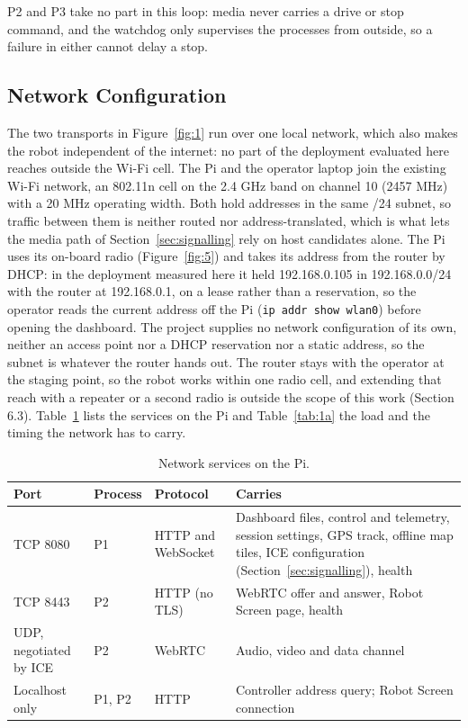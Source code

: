 P2 and P3 take no part in this loop: media never carries a drive or stop command, and the watchdog only supervises the processes from outside, so a failure in either cannot delay a stop.

\subsection{Network Configuration}
\label{sec:network_configuration}

The two transports in Figure~\ref{fig:1} run over one local network, which also makes the robot independent of the internet: no part of the deployment evaluated here reaches outside the Wi-Fi cell. The Pi and the operator laptop join the existing Wi-Fi network, an 802.11n cell on the 2.4 GHz band on channel 10 (2457 MHz) with a 20 MHz operating width. Both hold addresses in the same /24 subnet, so traffic between them is neither routed nor address-translated, which is what lets the media path of Section~\ref{sec:signalling} rely on host candidates alone. The Pi uses its on-board radio (Figure~\ref{fig:5}) and takes its address from the router by DHCP: in the deployment measured here it held 192.168.0.105 in 192.168.0.0/24 with the router at 192.168.0.1, on a lease rather than a reservation, so the operator reads the current address off the Pi (\texttt{ip addr show wlan0}) before opening the dashboard. The project supplies no network configuration of its own, neither an access point nor a DHCP reservation nor a static address, so the subnet is whatever the router hands out. The router stays with the operator at the staging point, so the robot works within one radio cell, and extending that reach with a repeater or a second radio is outside the scope of this work (Section 6.3). Table~\ref{tab:1} lists the services on the Pi and Table~\ref{tab:1a} the load and the timing the network has to carry.

\begin{table}[!t]
\centering
\caption{Network services on the Pi.}
\label{tab:1}
\begin{tabularx}{\linewidth}{l l l X}
\toprule
Port & Process & Protocol & Carries \\
\midrule
TCP 8080 & P1 & HTTP and WebSocket & Dashboard files, control and telemetry, session settings, GPS track, offline map tiles, ICE configuration (Section~\ref{sec:signalling}), health \\
TCP 8443 & P2 & HTTP (no TLS) & WebRTC offer and answer, Robot Screen page, health \\
UDP, negotiated by ICE & P2 & WebRTC & Audio, video and data channel \\
Localhost only & P1, P2 & HTTP & Controller address query; Robot Screen connection \\
\bottomrule
\end{tabularx}
\end{table}

